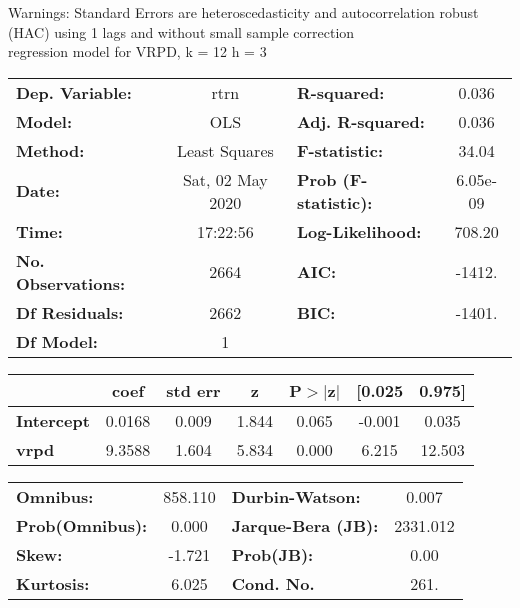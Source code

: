 Warnings: \newline
 [1] Standard Errors are heteroscedasticity and autocorrelation robust (HAC) using 1 lags and without small sample correction\\ 

regression model for VRPD, k = 12 h = 3\begin{center}
\begin{tabular}{lclc}
\toprule
\textbf{Dep. Variable:}    &       rtrn       & \textbf{  R-squared:         } &     0.036   \\
\textbf{Model:}            &       OLS        & \textbf{  Adj. R-squared:    } &     0.036   \\
\textbf{Method:}           &  Least Squares   & \textbf{  F-statistic:       } &     34.04   \\
\textbf{Date:}             & Sat, 02 May 2020 & \textbf{  Prob (F-statistic):} &  6.05e-09   \\
\textbf{Time:}             &     17:22:56     & \textbf{  Log-Likelihood:    } &    708.20   \\
\textbf{No. Observations:} &        2664      & \textbf{  AIC:               } &    -1412.   \\
\textbf{Df Residuals:}     &        2662      & \textbf{  BIC:               } &    -1401.   \\
\textbf{Df Model:}         &           1      & \textbf{                     } &             \\
\bottomrule
\end{tabular}
\begin{tabular}{lcccccc}
                   & \textbf{coef} & \textbf{std err} & \textbf{z} & \textbf{P$> |$z$|$} & \textbf{[0.025} & \textbf{0.975]}  \\
\midrule
\textbf{Intercept} &       0.0168  &        0.009     &     1.844  &         0.065        &       -0.001    &        0.035     \\
\textbf{vrpd}      &       9.3588  &        1.604     &     5.834  &         0.000        &        6.215    &       12.503     \\
\bottomrule
\end{tabular}
\begin{tabular}{lclc}
\textbf{Omnibus:}       & 858.110 & \textbf{  Durbin-Watson:     } &    0.007  \\
\textbf{Prob(Omnibus):} &   0.000 & \textbf{  Jarque-Bera (JB):  } & 2331.012  \\
\textbf{Skew:}          &  -1.721 & \textbf{  Prob(JB):          } &     0.00  \\
\textbf{Kurtosis:}      &   6.025 & \textbf{  Cond. No.          } &     261.  \\
\bottomrule
\end{tabular}
\end{center}

